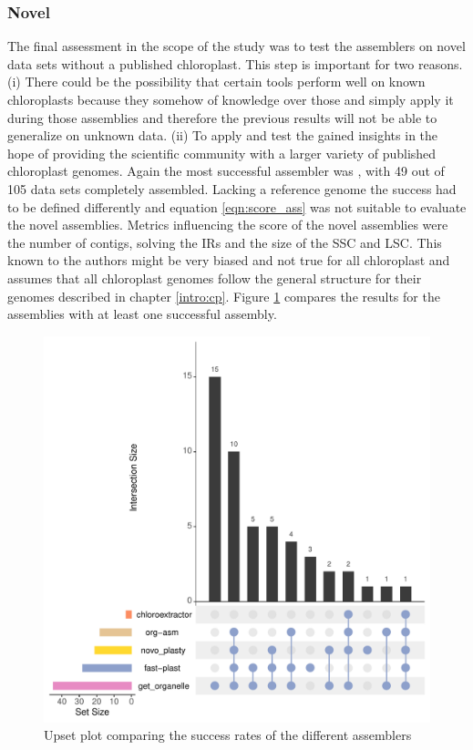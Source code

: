 \subsubsection{Novel}
 
The final assessment in the scope of the study was to test the assemblers on novel data sets without a
published chloroplast. This step is important for two reasons. (i) There could be the possibility that certain
tools perform well on known chloroplasts because they somehow of knowledge over those and simply apply it
during those assemblies and therefore the previous results will not be able to generalize on unknown
data. (ii) To apply and test the gained insights in the hope of providing the scientific community with a
larger variety of published chloroplast genomes. Again the most successful assembler was \go, with 49 out of
105 data sets completely assembled. Lacking a reference genome the success had to be defined differently and
equation \ref{eqn:score_ass} was not suitable to evaluate the novel assemblies. Metrics influencing the score
of the novel assemblies were the number of contigs, solving the IRs and the size of the SSC and LSC. This
known to the authors might be very biased and not true for all chloroplast and assumes that all chloroplast
genomes follow the general structure for their genomes described in chapter \ref{intro:cp}.
Figure \ref{fig:upset_novel} compares the results for the assemblies with at least one successful assembly.

\begin{figure}[H]
\centering
\includegraphics[height=.45\textheight, width=.95\textwidth]{Figures/upset_novel}
\decoRule
\caption[Upset plot comparing the success rates for novel data sets]{Upset plot comparing the success rates of the different assemblers}
\label{fig:upset_novel}
\end{figure}


